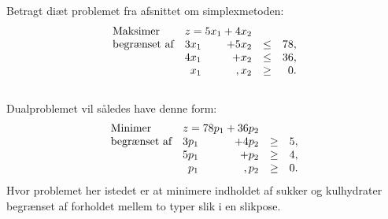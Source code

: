\begin{eks}
\label{dual}
%
Betragt diæt problemet fra afsnittet om simplexmetoden:
%
\begin{align*}
\begin{array}{lrrlr}
\text{Maksimer}		&	\multicolumn{2}{c}{z=5x_1+4x_2}  &\\
\text{begrænset af}	&3x_1& +5x_2			&\leq 	&78,\\
					&4x_1& + x_2				&\leq	& 36,\\
					&x_1& , x_2				&\geq	& 0.
\end{array}
\end{align*}
\\
Dualproblemet vil således have denne form:
\begin{align*}
\begin{array}{lrrlr}
\text{Minimer}		&	\multicolumn{2}{c}{z=78p_1+36p_2}  &\\
\text{begrænset af}	&3p_1& +4p_2			&\geq 	&5,\\
					&5p_1& + p_2				&\geq	& 4,\\
					&p_1& , p_2				&\geq	& 0.
\end{array}
\end{align*}
Hvor problemet her istedet er at minimere indholdet af sukker og kulhydrater begrænset af forholdet mellem to typer slik i en slikpose.
%
%
%
%
\end{eks}
